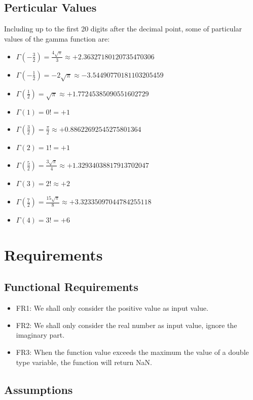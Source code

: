 \documentclass{report}
\begin{document}
\subsection{Perticular Values}
Including up to the first 20 digits after the decimal point, some of particular values of the gamma function are:
\begin{itemize}
\item $\Gamma \left ( -\frac{3}{2}  \right ) =\frac{4\sqrt{\pi } }{3} \approx +2.36327180120735470306$
\item $\Gamma \left ( -\frac{1}{2}  \right ) =-2\sqrt{\pi }  \approx -3.54490770181103205459$
\item $\Gamma \left ( \frac{1}{2}  \right ) =\sqrt{\pi }  \approx +1.77245385090551602729$
\item $\Gamma \left ( 1  \right ) =0! = +1$
\item $\Gamma \left ( \frac{3}{2}  \right ) =\frac{\pi }{2}   \approx +0.88622692545275801364$
\item $\Gamma \left ( 2 \right ) =1!=+1$
\item $\Gamma \left ( \frac{5}{2}  \right ) =\frac{3\sqrt{\pi } }{4} \approx +1.32934038817913702047$
\item $\Gamma \left ( 3  \right ) =2! \approx +2$
\item $\Gamma \left ( \frac{7}{2}   \right ) =\frac{15\sqrt{\pi } }{8}  \approx +3.32335097044784255118$
\item $\Gamma \left ( 4 \right ) =3!=+6$
\end{itemize}
\section{Requirements}
\subsection{Functional Requirements}
\begin{itemize}
\item FR1: We shall only consider the positive value as input value.
\item FR2: We shall only consider the real number as input value, ignore the imaginary part.
\item FR3: When the function value exceeds the maximum the value of a double type variable, the function will return NaN.
\end{itemize}
\subsection{Assumptions}
\end{document}
